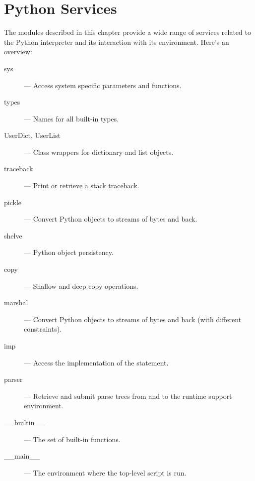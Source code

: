 \chapter{Python Services}

The modules described in this chapter provide a wide range of services
related to the Python interpreter and its interaction with its
environment.  Here's an overview:

\begin{description}

\item[sys]
--- Access system specific parameters and functions.

\item[types]
--- Names for all built-in types.

\item[UserDict, UserList]
--- Class wrappers for dictionary and list objects.

\item[traceback]
--- Print or retrieve a stack traceback.

\item[pickle]
--- Convert Python objects to streams of bytes and back.

\item[shelve]
--- Python object persistency.

\item[copy]
--- Shallow and deep copy operations.

\item[marshal]
--- Convert Python objects to streams of bytes and back (with
different constraints).

\item[imp]
--- Access the implementation of the  statement.

\item[parser]
--- Retrieve and submit parse trees from and to the runtime support
environment.

\item[__builtin__]
--- The set of built-in functions.

\item[__main__]
--- The environment where the top-level script is run.

\end{description}
